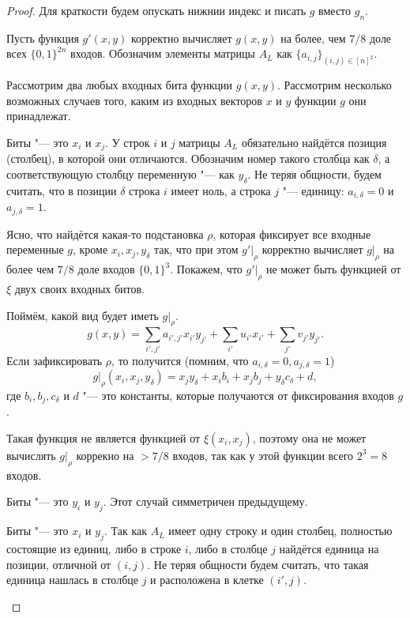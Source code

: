 \documentclass[a4paper, 14pt]{extarticle}
\begin{document}
\begin{proof}
Для краткости будем опускать нижнии индекс и писать $g$ вместо $g_n$.

Пусть функция $g'(x, y)$ корректно вычисляет $g(x, y)$ на более, чем $7/8$ доле
всех $\{0, 1\}^{2n}$ входов. Обозначим элементы матрицы $A_L$ как $\{a_{i,
j}\}_{(i, j) \in {[n]^2}}$.

Рассмотрим два любых входных бита функции $g(x, y)$. Рассмотрим несколько
возможных случаев того, каким из входных векторов $x$ и $y$ функции $g$ они
принадлежат.
\begin{description}
\item{Биты "--- это $x_i$ и $x_j$.} У строк $i$ и $j$ матрицы $A_L$ обязательно
найдётся позиция (столбец), в которой они отличаются. Обозначим номер такого
столбца как $\delta$, а соответствующую столбцу переменную "--- как $y_\delta$.
Не теряя общности, будем считать, что в позиции $\delta$ строка $i$ имеет ноль,
а строка $j$ "--- единицу: $a_{i, \delta} = 0$ и $a_{j, \delta} = 1$.

Ясно, что найдётся какая-то подстановка $\rho$, которая фиксирует все входные
переменные $g$, кроме $x_i, x_j, y_\delta$ так, что при этом $g' \rvert _ \rho$
корректно вычисляет $g \rvert _ \rho$ на более чем $7/8$ доле входов $\{0,
1\}^3$. Покажем, что $g' \rvert _ \rho$ не может быть функцией от $\xi$ двух своих
входных битов.

Поймём, какой вид будет иметь $g \rvert _ \rho$. 
\[
g(x, y) = \sum_{i', j'} a_{i', j'} x_{i'} y_{j'} + \sum_{i'} u_{i'} x_{i'} + \sum_{j'} v_{j'} y_{j'}.
\]
Если зафиксировать $\rho$, то получится (помним, что $a_{i, \delta} = 0, a_{j, \delta} = 1$)
\[
g \rvert _ \rho (x_i, x_j, y_\delta) = x_j y_\delta + x_i b_i + x_j b_j + y_\delta c_\delta + d,
\]
где $b_i, b_j, c_\delta$ и $d$ "--- это константы, которые получаются от
фиксирования входов $g$.

Такая функция не является функцией от $\xi(x_i, x_j)$, поэтому она не может
вычислять $g \rvert _ \rho$ коррекно на $> 7/8$ входов, так как у этой функции
всего $2^3 = 8$ входов.


\item{Биты "--- это $y_i$ и $y_j$.} Этот случай симметричен предыдущему.
\item{Биты "--- это $x_i$ и $y_j$.} Так как $A_L$ имеет одну строку и один
столбец, полностью состоящие из единиц, либо в строке $i$, либо в столбце $j$
найдётся единица на позиции, отличной от $(i, j)$. Не теряя общности будем
считать, что такая единица нашлась в столбце $j$ и расположена в клетке $(i',
j)$.


\end{description}
\end{proof}
\end{document}
